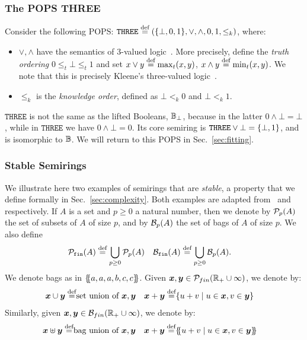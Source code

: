 \subsubsection{The POPS THREE} \label{subsec:three:pops}

Consider the following POPS:
$\texttt{THREE} \stackrel{\text{def}}{=} (\{\bot, 0,  1\}, \vee, \wedge,  0,
 1, \leq_k)$, where:
\begin{itemize}
\item $\vee, \wedge$ have the semantics of 3-valued
  logic~\cite{DBLP:journals/jlp/Fitting85a}.  More precisely, define
  the {\em truth ordering} $0 \leq_t \bot \leq_t 1$ and set
  $x \vee y \stackrel{\text{def}}{=} \max_t(x,y)$, $x \wedge y \stackrel{\text{def}}{=} \min_t(x,y)$.  We
  note that this is precisely Kleene's three-valued
  logic~\cite{DBLP:journals/logcom/Fitting91}.
\item $\leq_k$ is the {\em knowledge order\/}, defined as
  $\bot <_k  0$ and $\bot <_k  1$.
\end{itemize}
%
$\texttt{THREE}$ is not the same as the lifted Booleans, $\mathbb B_\bot$,
because in the latter $0 \wedge \bot = \bot$, while in
$\texttt{THREE}$ we have $0 \wedge \bot = 0$.  Its core semiring is
$\texttt{THREE} \vee \bot = \{\bot, 1\}$, and is isomorphic to $\mathbb B$.
We will return to this POPS in Sec.~\ref{sec:fitting}.

\subsubsection{Stable Semirings}
\label{subsec:stable:semirings}

We illustrate here two examples of semirings that are {\em stable}, a
property that we define formally in Sec.~\ref{sec:complexity}.  Both
examples are adapted from~\cite[Example 7.1.4]{semiring_book}
and~\cite[Chapt.8, Sec.1.3.2]{semiring_book} respectively.  If $A$ is
a set and $p \geq 0$ a natural number, then we denote by $\mathcal P_p(A)$
the set of subsets of $A$ of size $p$, and by $\mathcal B_p(A)$ the set of
bags of $A$ of size $p$.  We also define
\begin{align*}
    \mathcal P_{\texttt{fin}}(A) &\stackrel{\text{def}}{=} \bigcup_{p\geq 0}\mathcal P_p(A) &
    \mathcal B_{\texttt{fin}}(A) & \stackrel{\text{def}}{=} \bigcup_{p\geq 0}\mathcal B_p(A).
     &
\end{align*}
We denote bags as in $\{\hspace{-1mm}\{a,a,a,b,c,c\}\hspace{-1mm}\}$.  Given
$\bm x,\bm y \in \mathcal P_{fin}(\mathbb R_+ \cup \infty)$, we denote by:
%
\begin{align*}
  \bm x \cup \bm y \stackrel{\text{def}}{=} & \mbox{set union of $\bm x,\bm y$} &
  \bm x + \bm y \stackrel{\text{def}}{=} & \{{u+v}\mid{u \in \bm x, v \in \bm y}\}
\end{align*}
%
Similarly, given $\bm x,\bm y \in \mathcal B_{fin}(\mathbb R_+ \cup \infty)$, we denote
by:
%
\begin{align*}
  \bm x \uplus \bm y \stackrel{\text{def}}{=} & \mbox{bag union of $\bm x,\bm y$} &
  \bm x + \bm y \stackrel{\text{def}}{=} & \{\hspace{-1mm}\{{u+v}\mid{u \in \bm x, v \in \bm y}\}\hspace{-1mm}\}
\end{align*}


